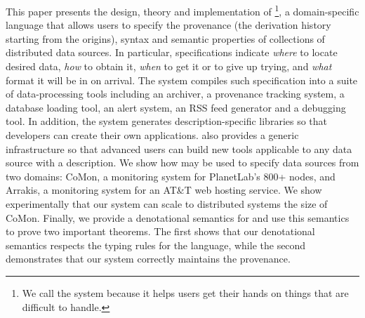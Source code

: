 
This paper presents the design, theory and implementation of
\padsd{}\footnote{We call the system \padsd{} because it helps users
get their hands on things that are difficult to handle.
}, a  domain-specific language that allows users to
specify the provenance (the derivation history starting from the origins), 
syntax and semantic properties of 
collections of distributed data sources. In particular, \padsd{}
specifications indicate 
{\em where} to locate desired data, {\em how} to obtain it, {\em
when} to get it or to give up trying, and {\em what}
format it will be in on arrival.  The \padsd{} system compiles such
specification into a suite of data-processing tools including 
an archiver, a provenance tracking system, a database loading tool, 
an alert system, an RSS feed generator and a
debugging tool.  In addition, the system generates description-specific
libraries so that developers can create their
own applications. \padsd{} also provides a generic infrastructure
so that advanced users can build new tools applicable to any 
data source with a \padsd{} description.
We show how \padsd{} may be used to specify data sources from two domains:
CoMon, a monitoring system for PlanetLab's 800+ nodes, and Arrakis, a monitoring
system for an AT\&T web hosting service.  
We show experimentally that our system can scale to distributed
systems the size of CoMon.  
Finally, we provide a
denotational semantics for \padsd{} and use this semantics to prove two important
theorems.  The first shows that our denotational semantics respects the
typing rules for the language, while the second demonstrates that our 
system correctly maintains the provenance.






